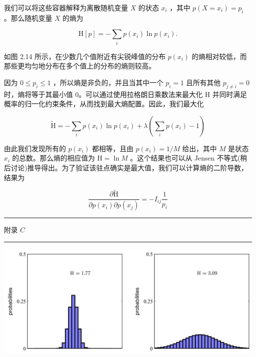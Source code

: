 \documentclass[10pt]{article}
\newcommand{\HRule}{\begin{center}\rule{0.9\linewidth}{0.2mm}\end{center}}
\begin{document}
我们可以将这些容器解释为离散随机变量 \(X\) 的状态 \({x}_{i}\) ，其中 \(p\left( {X = {x}_{i}}\right)  = {p}_{i}\) 。那么随机变量 \(X\) 的熵为

\[
\mathrm{H}\left\lbrack  p\right\rbrack   =  - \mathop{\sum }\limits_{i}p\left( {x}_{i}\right) \ln p\left( {x}_{i}\right) . \tag{2.86}
\]

如图 2.14 所示，在少数几个值附近有尖锐峰值的分布 \(p\left( {x}_{i}\right)\) 的熵相对较低，而那些更均匀地分布在多个值上的分布的熵则较高。

因为 \(0 \leq  {p}_{i} \leq  1\) ，所以熵是非负的，并且当其中一个 \({p}_{i} = 1\) 且所有其他 \({p}_{j \neq  i} = 0\) 时，熵将等于其最小值 0。可以通过使用拉格朗日乘数法来最大化 \(\mathrm{H}\) 并同时满足概率的归一化约束条件，从而找到最大熵配置。因此，我们最大化

\[
\widetilde{\mathrm{H}} =  - \mathop{\sum }\limits_{i}p\left( {x}_{i}\right) \ln p\left( {x}_{i}\right)  + \lambda \left( {\mathop{\sum }\limits_{i}p\left( {x}_{i}\right)  - 1}\right)  \tag{2.87}
\]

由此我们发现所有的 \(p\left( {x}_{i}\right)\) 都相等，且由 \(p\left( {x}_{i}\right)  = 1/M\) 给出，其中 \(M\) 是状态 \({x}_{i}\) 的总数。那么熵的相应值为 \(\mathrm{H} = \ln M\) 。这个结果也可以从 Jensen 不等式(稍后讨论)推导得出。为了验证该驻点确实是最大值，我们可以计算熵的二阶导数，结果为

\[
\frac{\partial \widetilde{\mathrm{H}}}{\partial p\left( {x}_{i}\right) \partial p\left( {x}_{j}\right) } =  - {I}_{ij}\frac{1}{{p}_{i}} \tag{2.88}
\]

\HRule

附录 \(C\)

\HRule

\begin{center}
\includegraphics[max width=1.0\textwidth]{images/0194e279-9b28-703a-88f4-c3ac21e2010d_68_224_402_1306_548_0.jpg}
\end{center}
\hspace*{3em} 
\end{document}
